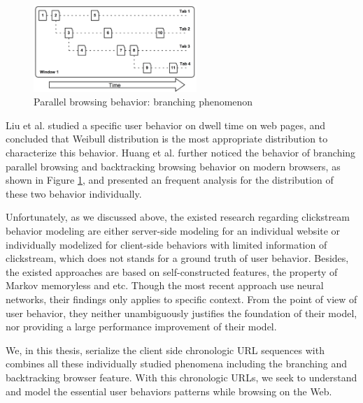
\begin{figure}[H]
    \centering
    \includegraphics[width=0.55\textwidth]{figures/branching-and-backtracking}
    \caption{Parallel browsing behavior: branching phenomenon \cite{huang2010parallel}}
    \label{fig:backtrace}
\end{figure}

Liu et al. \cite{liu2010understanding} studied a specific user behavior on dwell time on web pages, and concluded that
Weibull distribution is the most appropriate distribution to characterize this behavior. 
Huang et al. \cite{huang2010parallel, huang2012no} further 
noticed the behavior of branching parallel browsing and backtracking browsing
behavior on modern browsers, as shown in Figure \ref{fig:backtrace}, 
and presented an frequent analysis for the distribution of these two behavior individually.

Unfortunately, as we discussed above, the existed research regarding clickstream 
behavior modeling are either server-side modeling for an individual website or 
individually modelized for client-side behaviors with limited information of clickstream,
which does not stands for a ground truth of user behavior. 
Besides, the existed approaches are based on self-constructed features, 
the property of Markov memoryless and etc. Though the most recent
approach use neural networks, their findings only applies to specific context.
From the point of view of user behavior, they 
neither unambiguously justifies the foundation of their model, 
nor providing a large performance improvement of their model.

We, in this thesis, serialize the client side chronologic URL sequences with combines all 
these individually studied phenomena including the branching and backtracking browser 
feature. With this chronologic URLs, we seek to understand and model the essential user 
behaviors patterns while browsing on the Web.


